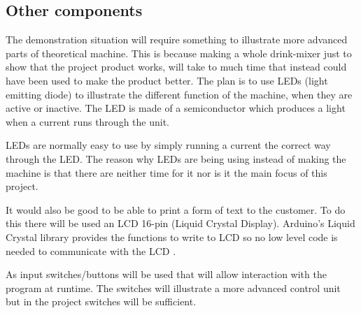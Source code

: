 \subsection{Other components}
The demonstration situation will require something to illustrate more advanced parts of theoretical machine. %
This is because making a whole drink-mixer just to show that the project product works, will take to much time that instead could have been used to make the product better. %
The plan is to use LEDs (light emitting diode) to illustrate the different function of the machine, when they are active or inactive. The LED is made of a semiconductor which produces a light when a current runs through the unit.

LEDs are normally easy to use by simply running a current the correct way through the LED.
The reason why LEDs are being using instead of making the machine is that there are neither time for it nor is it the main focus of this project.

It would also be good to be able to print a form of text to the customer. To do this there will be used an LCD 16-pin (Liquid Crystal Display). Arduino's Liquid Crystal library provides the functions to write to LCD so no low level code is needed to communicate with the LCD \citep{ArduinoLCD}.

As input switches/buttons will be used that will allow interaction with the program at runtime. The switches will illustrate a more advanced control unit but in the project switches will be sufficient.
